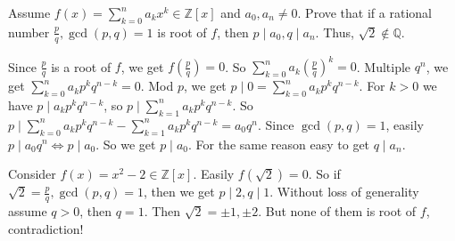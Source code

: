 \documentclass{ctexart}
\begin{document}
\begin{problem}\label{pro:p10.3}
  Assume \(f(x)=\sum_{k=0}^{n}a_k x^k \in \mathbb{Z}[x]\) and \(a_0,a_n \neq 0\).
  Prove that if a rational number \(\frac{p}{q},\gcd(p,q)=1\) is root of \(f\), then \(p \mid a_0,q \mid a_n\).
  Thus, \(\sqrt{2} \notin \mathbb{Q}\).
\end{problem}
\begin{solution}
  Since \(\frac{p}{q}\) is a root of \(f\), we get \(f(\frac{p}{q})=0\).
  So \(\sum_{k=0}^{n}a_k (\frac{p}{q})^k=0\).
  Multiple \(q^n\), we get \(\sum_{k=0}^{n}a_k p^k q^{n-k}=0\).
  Mod \(p\), we get \(p \mid 0 = \sum_{k=0}^{n}a_k p^k q^{n-k}\).
  For \(k>0\) we have \(p \mid a_k p^k q^{n-k}\), so \(p \mid \sum_{k=1}^{n}a_k p^k q^{n-k}\).
  So \(p \mid \sum_{k=0}^{n}a_k p^k q^{n-k}-\sum_{k=1}^{n}a_k p^k q^{n-k}=a_0q^n\).
  Since \(\gcd(p,q)=1\), easily \(p \mid a_0 q^n \iff p \mid a_0\).
  So we get \(p \mid a_0\).
  For the same reason easy to get \(q \mid a_n\).

  Consider \(f(x)=x^2-2 \in \mathbb{Z}[x]\). Easily \(f(\sqrt{2})=0\).
  So if \(\sqrt{2}=\frac{p}{q},\gcd(p,q)=1\), then we get \(p \mid 2,q \mid 1\).
  Without loss of generality assume \(q > 0\), then \(q=1\).
  Then \(\sqrt{2}=\pm 1 ,\pm 2\).
  But none of them is root of \(f\), contradiction!
\end{solution}
\end{document}
